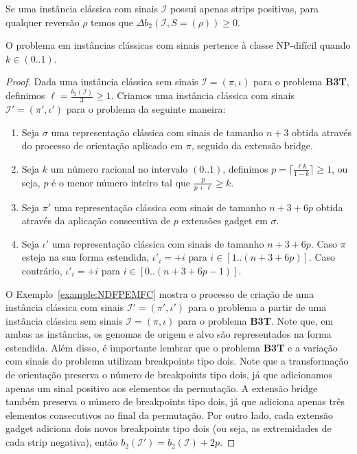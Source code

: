 \begin{lemma}\label{lemma:CWNRJAPM}
Se uma instância clássica com sinais $\mathcal{I}$ possui apenas strips positivas, para qualquer reversão $\rho$ temos que $\Delta b_2(\mathcal{I}, S=(\rho)) \ge 0$.
\end{lemma}

\begin{theorem}\label{theorem:NSWQYFLG}
O problema \SbPRT{} em instâncias clássicas com sinais pertence à classe NP-difícil quando $k \in (0..1)$.
\end{theorem}
\begin{proof}
Dada uma instância clássica sem sinais $\mathcal{I}=(\pi,\iota)$ para o problema \textbf{B3T}, definimos $\ell = \frac{b_2(\mathcal{I})}{3} \ge 1$. Criamos uma instância clássica com sinais $\mathcal{I'}=(\pi',\iota')$ para o problema \SbPRT{} da seguinte maneira:

\begin{enumerate}
  \item Seja $\sigma$ uma representação clássica com sinais de tamanho $n+3$ obtida através do processo de orientação aplicado em $\pi$, seguido da extensão bridge.
  \item Seja $k$ um número racional no intervalo $(0..1)$, definimos $p = \lceil\frac{\ell k}{1-k}\rceil \ge 1$, ou seja, $p$ é o menor número inteiro tal que $\frac{p}{p+\ell} \ge k$.
  \item Seja $\pi'$ uma representação clássica com sinais de tamanho $n+3+6p$ obtida através da aplicação consecutiva de $p$ extensões gadget em $\sigma$.
  \item Seja $\iota'$ uma representação clássica com sinais de tamanho $n+3+6p$. Caso $\pi$ esteja na sua forma estendida, $\iota'_i = +i$ para $i \in [1..(n+3+6p)]$. Caso contrário,  $\iota'_i = +i$ para $i \in [0..(n+3+6p-1)]$.
\end{enumerate}

O Exemplo~\ref{example:NDFPEMFC} mostra o processo de criação de uma instância clássica com sinais $\mathcal{I'}=(\pi',\iota')$ para o problema \SbPRT{} a partir de uma instância clássica sem sinais $\mathcal{I}=(\pi,\iota)$ para o problema \textbf{B3T}. Note que, em ambas as instâncias, os genomas de origem e alvo são representados na forma estendida. Além disso, é importante lembrar que o problema \textbf{B3T} e a variação com sinais do problema \SbPRT{} utilizam breakpoints tipo dois. Note que a transformação de orientação preserva o número de breakpoints tipo dois, já que adicionamos apenas um sinal positivo aos elementos da permutação. A extensão bridge também preserva o número de breakpoints tipo dois, já que adiciona apenas três elementos consecutivos ao final da permutação. Por outro lado, cada extensão gadget adiciona dois novos breakpoints tipo dois (ou seja, as extremidades de cada strip negativa), então $b_2(\mathcal{I'}) = b_2(\mathcal{I}) +2p$.


\end{proof}

